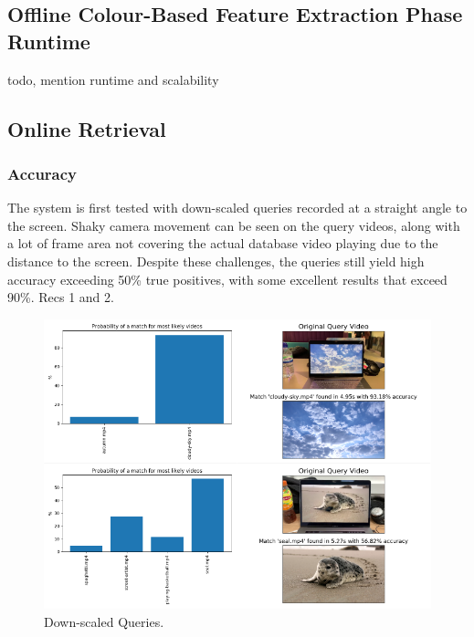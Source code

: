 
\subsection{Offline Colour-Based Feature Extraction Phase Runtime}

todo, mention runtime and scalability


\subsection{Online Retrieval}

\subsubsection{Accuracy}

The system is first tested with down-scaled queries recorded at a straight angle to the screen. Shaky camera movement can be seen on the query videos, along with a lot of frame area not covering the actual database video playing due to the distance to the screen. Despite these challenges, the queries still yield high accuracy exceeding 50\% true positives, with some excellent results that exceed 90\%. Recs 1 and 2.

\begin{figure}[h] 
\centerline{\includegraphics[width=\textwidth]{figures/evaluation/downscaled-queries.png}}
\caption{\label{fig:evaluation-downscaled-queries}Down-scaled Queries.}
\end{figure}


